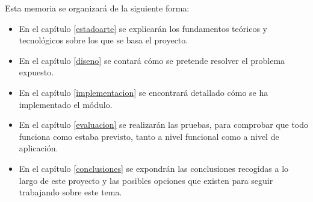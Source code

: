 Esta memoria se organizará de la siguiente forma: 
\begin{itemize}
\item En el capítulo \ref{estadoarte} se explicarán los fundamentos teóricos y tecnológicos sobre los que se basa el proyecto.
\item En el capítulo \ref{diseno} se contará cómo se pretende resolver el problema expuesto.
\item En el capítulo \ref{implementacion} se encontrará detallado cómo se ha implementado el módulo.
\item En el capítulo \ref{evaluacion} se realizarán las pruebas, para comprobar que todo funciona como estaba previsto, tanto a nivel 
funcional como a nivel de aplicación.
\item En el capítulo \ref{conclusiones} se expondrán las conclusiones recogidas a lo largo de este proyecto y las posibles 
opciones que existen para seguir trabajando sobre este tema.
\end{itemize}
